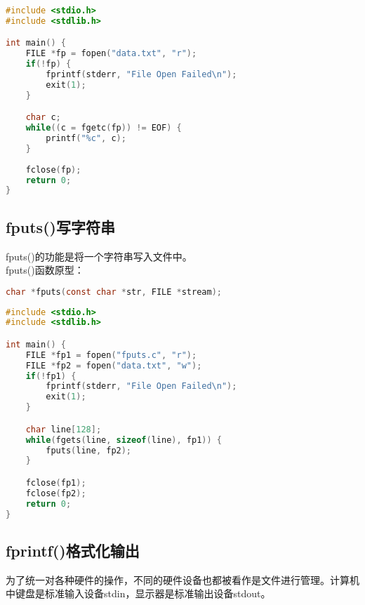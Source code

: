 \begin{lstlisting}[language=C, title=fgets.c]
#include <stdio.h>
#include <stdlib.h>

int main() {
    FILE *fp = fopen("data.txt", "r");
    if(!fp) {
        fprintf(stderr, "File Open Failed\n");
        exit(1);
    }

    char c;
    while((c = fgetc(fp)) != EOF) {
        printf("%c", c);
    }
    
    fclose(fp);
    return 0;
}
\end{lstlisting}

\vspace{0.5cm}

\subsection{fputs()写字符串}

fputs()的功能是将一个字符串写入文件中。\\

fputs()函数原型：

\vspace{-0.5cm}

\begin{lstlisting}[language=C]
char *fputs(const char *str, FILE *stream);
\end{lstlisting}

\vspace{0.5cm}


\begin{lstlisting}[language=C, title=fputs.c]
#include <stdio.h>
#include <stdlib.h>

int main() {
    FILE *fp1 = fopen("fputs.c", "r");
    FILE *fp2 = fopen("data.txt", "w");
    if(!fp1) {
        fprintf(stderr, "File Open Failed\n");
        exit(1);
    }

    char line[128];
    while(fgets(line, sizeof(line), fp1)) {
        fputs(line, fp2);
    }

    fclose(fp1);
    fclose(fp2);
    return 0;
}
\end{lstlisting}

\vspace{0.5cm}

\subsection{fprintf()格式化输出}

为了统一对各种硬件的操作，不同的硬件设备也都被看作是文件进行管理。计算机中键盘是标准输入设备stdin，显示器是标准输出设备stdout。\\

